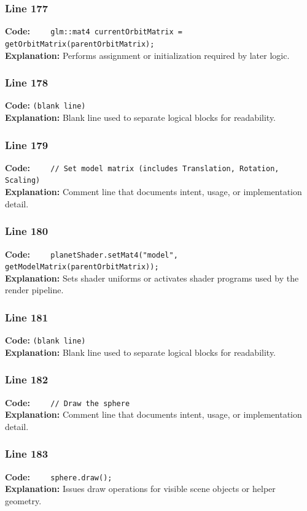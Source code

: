 \documentclass[11pt,a4paper]{article}
\begin{document}
\subsubsection*{Line 177}
\textbf{Code:} \verb|    glm::mat4 currentOrbitMatrix = getOrbitMatrix(parentOrbitMatrix);|\\
\textbf{Explanation:} Performs assignment or initialization required by later logic.

\subsubsection*{Line 178}
\textbf{Code:} \texttt{(blank line)}\\
\textbf{Explanation:} Blank line used to separate logical blocks for readability.

\subsubsection*{Line 179}
\textbf{Code:} \verb|    // Set model matrix (includes Translation, Rotation, Scaling)|\\
\textbf{Explanation:} Comment line that documents intent, usage, or implementation detail.

\subsubsection*{Line 180}
\textbf{Code:} \verb|    planetShader.setMat4("model", getModelMatrix(parentOrbitMatrix));|\\
\textbf{Explanation:} Sets shader uniforms or activates shader programs used by the render pipeline.

\subsubsection*{Line 181}
\textbf{Code:} \texttt{(blank line)}\\
\textbf{Explanation:} Blank line used to separate logical blocks for readability.

\subsubsection*{Line 182}
\textbf{Code:} \verb|    // Draw the sphere|\\
\textbf{Explanation:} Comment line that documents intent, usage, or implementation detail.

\subsubsection*{Line 183}
\textbf{Code:} \verb|    sphere.draw();|\\
\textbf{Explanation:} Issues draw operations for visible scene objects or helper geometry.
\end{document}
